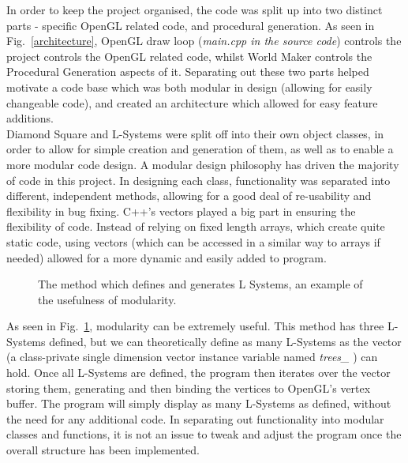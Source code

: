 \documentclass[a4paper,10pt]{report}
\begin{document}
In order to keep the project organised, the code was split up into two distinct parts - specific OpenGL related code, and procedural generation. As seen in Fig.~\ref{architecture}, OpenGL draw loop (\textit{main.cpp in the source code}) controls the project controls the OpenGL related code, whilst World Maker controls the Procedural Generation aspects of it. Separating out these two parts helped motivate a code base which was both modular in design (allowing for easily changeable code), and created an architecture which allowed for easy feature additions. \\

Diamond Square and L-Systems were split off into their own object classes, in order to allow for simple creation and generation of them, as well as to enable a more modular code design. A modular design philosophy has driven the majority of code in this project. In designing each class, functionality was separated into different, independent methods, allowing for a good deal of re-usability and flexibility in bug fixing. C++'s vectors played a big part in ensuring the flexibility of code. Instead of relying on fixed length arrays, which create quite static code, using vectors (which can be accessed in a similar way to arrays if needed) allowed for a more dynamic and easily added to program. \\

\begin{figure}[h!]
\centering
 \caption{The method which defines and generates L Systems, an example of the usefulness of modularity.}
 \label{fig:tree_generation}
\end{figure}

As seen in Fig.~\ref{fig:tree_generation}, modularity can be extremely useful. This method has three L-Systems defined, but we can theoretically define as many L-Systems as the vector (a class-private single dimension vector instance variable named \textit{trees\_} ) can hold. Once all L-Systems are defined, the program then iterates over the vector storing them, generating and then binding the vertices to OpenGL's vertex buffer. The program will simply display as many L-Systems as defined, without the need for any additional code. In separating out functionality into modular classes and functions, it is not an issue to tweak and adjust the program once the overall structure has been implemented.
\end{document}
